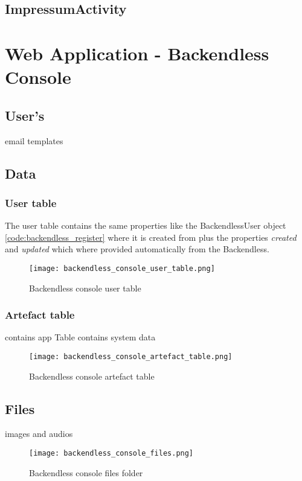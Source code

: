 \subsection{ImpressumActivity}


\section{Web Application - Backendless Console}

\subsection{User's}
email templates
\subsection{Data}
\subsubsection{User table}
The user table contains the same properties like the BackendlessUser object \ref{code:backendless_register} where it is created from plus the properties \textit{created} and \textit{updated} which where provided automatically from the Backendless.

\begin{figure}[H]
	\centering \texttt{[image: backendless\_console\_user\_table.png]}
	\caption[Backendless console user table]{Backendless console user table}
	\label{fig:backendlessConsoleUserTable}
\end{figure}

\subsubsection{Artefact table}
contains app Table
contains system data
\begin{figure}[H]
	\centering \texttt{[image: backendless\_console\_artefact\_table.png]}
	\caption[Backendless console artefact table]{Backendless console artefact table}
	\label{fig:backendlessConsoleArtefactTable}
\end{figure}


\subsection{Files}
images and audios
\begin{figure}[H]
	\centering \texttt{[image: backendless\_console\_files.png]}
	\caption[Backendless console files]{Backendless console files folder}
	\label{fig:backendlessConsoleFiles}
\end{figure}

